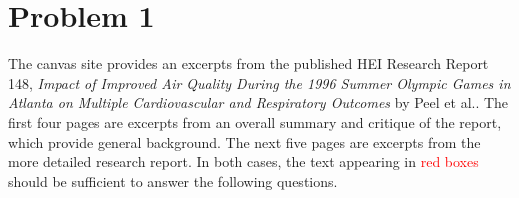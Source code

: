 
\section{Problem 1}

\begin{quoting}
  The canvas site provides an excerpts from the published HEI Research
  Report 148, \emph{Impact of Improved Air Quality During the 1996
    Summer Olympic Games in Atlanta on Multiple Cardiovascular and
    Respiratory Outcomes} by Peel et al.. The first four pages are
  excerpts from an overall summary and critique of the report, which
  provide general background. The next five pages are excerpts from
  the more detailed research report. In both cases, the text appearing
  in \textcolor{red}{red boxes} should be sufficient to answer the
  following questions.
\end{quoting}

